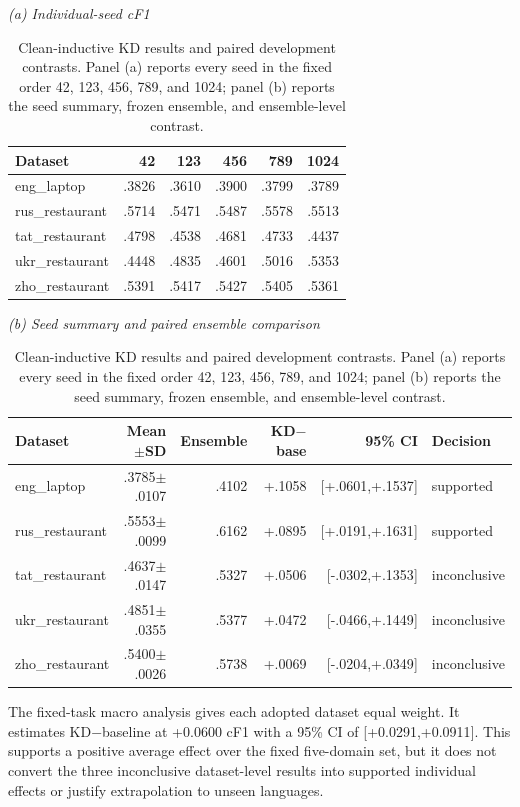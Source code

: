 \begin{table}[tbp]
\caption{Clean-inductive KD results and paired development contrasts. Panel
(a) reports every seed in the fixed order 42, 123, 456, 789, and 1024; panel
(b) reports the seed summary, frozen ensemble, and ensemble-level contrast.}
\label{tab:clean-kd}
\centering
\scriptsize
\setlength{\tabcolsep}{3.4pt}
\textit{(a) Individual-seed cF1}\\[2pt]
\begin{tabular*}{\linewidth}{@{\extracolsep{\fill}}lrrrrr@{}}
\toprule
Dataset & 42 & 123 & 456 & 789 & 1024 \\
\midrule
eng\_laptop     & .3826 & .3610 & .3900 & .3799 & .3789 \\
rus\_restaurant & .5714 & .5471 & .5487 & .5578 & .5513 \\
tat\_restaurant & .4798 & .4538 & .4681 & .4733 & .4437 \\
ukr\_restaurant & .4448 & .4835 & .4601 & .5016 & .5353 \\
zho\_restaurant & .5391 & .5417 & .5427 & .5405 & .5361 \\
\bottomrule
\end{tabular*}

\medskip
\textit{(b) Seed summary and paired ensemble comparison}\\[2pt]
\begin{tabular*}{\linewidth}{@{\extracolsep{\fill}}lrrrrl@{}}
\toprule
Dataset & Mean$\pm$SD & Ensemble & KD$-$base & 95\% CI & Decision \\
\midrule
eng\_laptop     & .3785$\pm$.0107 & .4102 & +.1058 & {[}+.0601,+.1537{]} & supported \\
rus\_restaurant & .5553$\pm$.0099 & .6162 & +.0895 & {[}+.0191,+.1631{]} & supported \\
tat\_restaurant & .4637$\pm$.0147 & .5327 & +.0506 & {[}-.0302,+.1353{]} & inconclusive \\
ukr\_restaurant & .4851$\pm$.0355 & .5377 & +.0472 & {[}-.0466,+.1449{]} & inconclusive \\
zho\_restaurant & .5400$\pm$.0026 & .5738 & +.0069 & {[}-.0204,+.0349{]} & inconclusive \\
\bottomrule
\end{tabular*}
\end{table}

The fixed-task macro analysis gives each adopted dataset equal weight.
It estimates KD−baseline at +0.0600 cF1 with a 95\% CI of
{[}+0.0291,+0.0911{]}. This supports a positive average effect over the
fixed five-domain set, but it does not convert the three inconclusive
dataset-level results into supported individual effects or justify
extrapolation to unseen languages.

